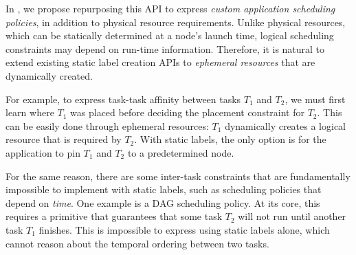 
In \name{}, we propose repurposing this API to express \emph{custom application scheduling policies}, in addition to physical resource requirements.
Unlike physical resources, which can be statically determined at a node's launch time, logical scheduling constraints may depend on run-time information.
Therefore, it is natural to extend existing static label creation APIs to \emph{ephemeral resources} that are dynamically created.

For example, to express task-task affinity between tasks $T_1$ and $T_2$, we must first learn where $T_1$ was placed before deciding the placement constraint for $T_2$.
This can be easily done through ephemeral resources: $T_1$ dynamically creates a logical resource that is required by $T_2$.
With static labels, the only option is for the application to pin $T_1$ and $T_2$ to a predetermined node.


For the same reason, there are some inter-task constraints that are fundamentally impossible to implement with static labels, such as scheduling policies that depend on \emph{time}.
One example is a DAG scheduling policy.
At its core, this requires a primitive that guarantees that some task $T_2$ will not run until another task $T_1$ finishes.
This is impossible to express using static labels alone, which cannot reason about the temporal ordering between two tasks.


